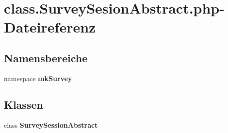 \section{class.SurveySesionAbstract.php-Dateireferenz}
\label{class_8SurveySesionAbstract_8php}
\subsection*{Namensbereiche}
\begin{CompactItemize}
\item 
namespace {\bf mkSurvey}
\end{CompactItemize}
\subsection*{Klassen}
\begin{CompactItemize}
\item 
class {\bf SurveySessionAbstract}
\end{CompactItemize}

